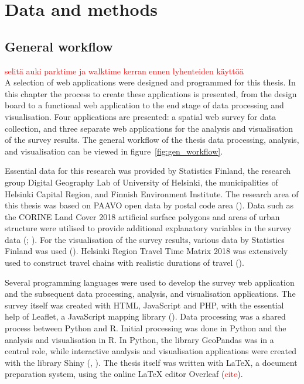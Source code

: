 \section{Data and methods}
\subsection{General workflow}
\justify

\textcolor{red}{selitä auki parktime ja walktime kerran ennen lyhenteiden käyttöä}\\
A selection of web applications were designed and programmed for this thesis. In this chapter the process to create these applications is presented, from the design board to a functional web application to the end stage of data processing and visualisation. Four applications are presented: a spatial web survey for data collection, and three separate web applications for the analysis and visualisation of the survey results. The general workflow of the thesis data processing, analysis, and visualisation can be viewed in figure~\ref{fig:gen_workflow}.

Essential data for this research was provided by Statistics Finland, the research group Digital Geography Lab of University of Helsinki, the municipalities of Helsinki Capital Region, and Finnish Environment Institute. The research area of this thesis was based on PAAVO open data by postal code area (\cite{StatisticsFinland2019a}). Data such as the CORINE Land Cover 2018 artificial surface polygons and areas of urban structure were utilised to provide additional explanatory variables in the survey data (\cite{FinnishEnvironmentInstitute2018}; \cite{Ristimaki2017}). For the visualisation of the survey results, various data by Statistics Finland was used (\cite{StatisticsFinland2012}). Helsinki Region Travel Time Matrix 2018 was extensively used to construct travel chains with realistic durations of travel (\cite{Tenkanen2018}).

Several programming languages were used to develop the survey web application and the subsequent data processing, analysis, and visualisation applications. The survey itself was created with HTML, JavaScript and PHP, with the essential help of Leaflet, a JavaScript mapping library (\cite{Agafonkin2019}). Data processing was a shared process between Python and R. Initial processing was done in Python and the analysis and visualisation in R. In Python, the library GeoPandas was in a central role, while interactive analysis and visualisation applications were created with the library Shiny (\cite{GeoPandasDevelopers2019}, \cite{Chang2019}). The thesis itself was written with LaTeX, a document preparation system, using the online LaTeX editor Overleaf (\textcolor{red}{cite}).

